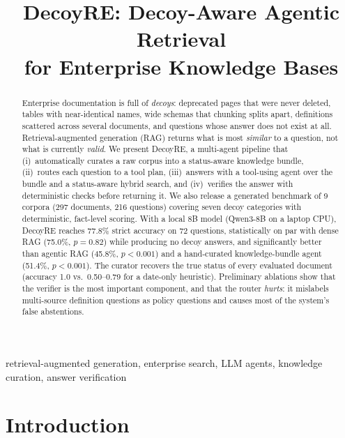 \documentclass[conference]{IEEEtran}
\begin{document}
\title{DecoyRE: Decoy-Aware Agentic Retrieval\\for Enterprise Knowledge Bases}

\author{
}

\maketitle

\begin{abstract}
Enterprise documentation is full of \emph{decoys}: deprecated pages that were never deleted, tables with
near-identical names, wide schemas that chunking splits apart, definitions scattered across several
documents, and questions whose answer does not exist at all. Retrieval-augmented generation (RAG)
returns what is most \emph{similar} to a question, not what is currently \emph{valid}. We present DecoyRE,
a multi-agent pipeline that (i)~automatically curates a raw corpus into a status-aware knowledge bundle,
(ii)~routes each question to a tool plan, (iii)~answers with a tool-using agent over the bundle and a
status-aware hybrid search, and (iv)~verifies the answer with deterministic checks before returning it.
We also release a generated benchmark of 9 corpora (297 documents, 216 questions) covering seven decoy
categories with deterministic, fact-level scoring. With a local 8B model (Qwen3-8B on a laptop CPU),
DecoyRE reaches 77.8\% strict accuracy on 72 questions, statistically on par with dense RAG (75.0\%,
$p=0.82$) while producing no decoy answers, and significantly better than agentic RAG (45.8\%, $p<0.001$)
and a hand-curated knowledge-bundle agent (51.4\%, $p<0.001$). The curator recovers the true status of every
evaluated document (accuracy 1.0 vs.\ 0.50--0.79 for a date-only heuristic). Preliminary ablations show that
the verifier is the most important component, and that the router \emph{hurts}: it mislabels multi-source
definition questions as policy questions and causes most of the system's false abstentions.
\end{abstract}

\begin{IEEEkeywords}
retrieval-augmented generation, enterprise search, LLM agents, knowledge curation, answer verification
\end{IEEEkeywords}

\section{Introduction}
\end{document}
